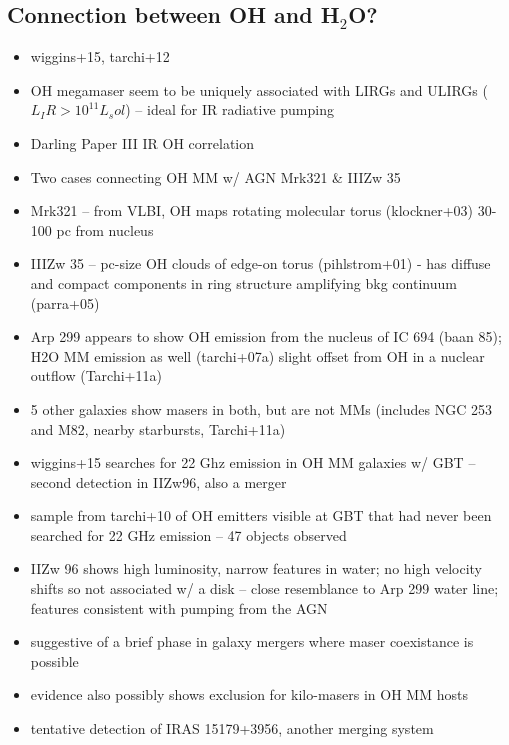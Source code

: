 \subsection{Connection between OH and H$_2$O?}
\label{sec:oh_and_h2o}

\begin{itemize}
\item wiggins+15, tarchi+12
\item OH megamaser seem to be uniquely associated with LIRGs and ULIRGs ($L_IR>10^11 L_sol$) -- ideal for IR radiative pumping 
\item Darling Paper III IR OH correlation
\item Two cases connecting OH MM w/ AGN Mrk321 \& IIIZw 35
\item Mrk321 -- from VLBI, OH maps rotating molecular torus (klockner+03) 30-100 pc from nucleus
\item IIIZw 35 -- pc-size OH clouds of edge-on torus (pihlstrom+01) - has diffuse and compact components in ring structure amplifying bkg continuum (parra+05)
\item Arp 299 appears to show OH emission from the nucleus of IC 694 (baan 85); H2O MM emission as well (tarchi+07a) slight offset from OH in a nuclear outflow (Tarchi+11a)
\item 5 other galaxies show masers in both, but are not MMs (includes NGC 253 and M82, nearby starbursts, Tarchi+11a)
\item wiggins+15 searches for 22 Ghz emission in OH MM galaxies w/ GBT -- second detection in IIZw96, also a merger
\item sample from tarchi+10 of OH emitters visible at GBT that had never been searched for 22 GHz emission -- 47 objects observed
\item IIZw 96 shows high luminosity, narrow features in water; no high velocity shifts so not associated w/ a disk -- close resemblance to Arp 299 water line; features consistent with pumping from the AGN
\item suggestive of a brief phase in galaxy mergers where maser coexistance is possible
\item evidence also possibly shows exclusion for kilo-masers in OH MM hosts
\item tentative detection of IRAS 15179+3956, another merging system
\end{itemize}